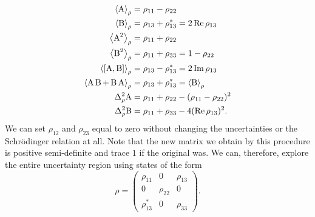 \begin{align}
  \expr{\opa} &= \rho_{11} - \rho_{22}\\
  \expr{\opb} &= \rho_{13} + \rho_{13}^* = 2\operatorname{Re}{\rho_{13} }\\
  \expr{\opa^2} &= \rho_{11} + \rho_{22}\\
  \expr{\opb^2} &= \rho_{11} + \rho_{33} = 1 - \rho_{22}\\
  \expr{\com{\opa}{\opb}} &= \rho_{13} - \rho_{13}^* = 2\operatorname{Im}{\rho_{13} }\\
  \expr{\acom{\opa}{\opb}} &= \rho_{13} + \rho_{13}^* = \expr{\opb}\\
  \varr{\opa} &= \rho_{11} + \rho_{22} - (\rho_{11} - \rho_{22})^2\\
  \varr{\opb} &= \rho_{11} + \rho_{33} - 4(\operatorname{Re}{\rho_{13}})^2.
\end{align}
We can set $\rho_{12}$ and $\rho_{23}$ equal to zero without changing the uncertainties or the Schr\"odinger relation at all. Note that the new matrix we obtain by this procedure is positive semi-definite and trace $1$ if the original was. We can, therefore, explore the entire uncertainty region using states of the form
\begin{equation} \label{eq:qutrit-specialised}
  \rho = \begin{pmatrix}
    \rho_{11} & 0 & \rho_{13}\\
    0 & \rho_{22} & 0\\
    \rho_{13}^* & 0 & \rho_{33}
  \end{pmatrix}.
\end{equation}

